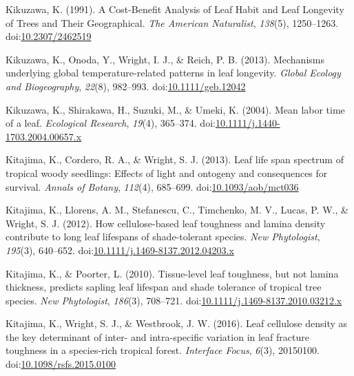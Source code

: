 \documentclass[12pt,]{article}
\theoremstyle{definition}
\theoremstyle{definition}
\theoremstyle{definition}
\theoremstyle{remark}
\providecommand{\DIFdelend}{} %
\DeclareRobustCommand{\DIFdelend}{\DIFOaddend \let\includegraphics\DIFOincludegraphics} %
\begin{document}
\begin{itemize}
\DIFdelend \hypertarget{ref-Kikuzawa1991}{}%
Kikuzawa, K. (1991). A Cost-Benefit Analysis of Leaf Habit and Leaf
Longevity of Trees and Their Geographical. \emph{The American
Naturalist}, \emph{138}(5), 1250--1263.
doi:\href{https://doi.org/10.2307/2462519}{10.2307/2462519}

\leavevmode\hypertarget{ref-Kikuzawa2013}{}%
Kikuzawa, K., Onoda, Y., Wright, I. J., \& Reich, P. B. (2013).
Mechanisms underlying global temperature-related patterns in leaf
longevity. \emph{Global Ecology and Biogeography}, \emph{22}(8),
982--993.
doi:\href{https://doi.org/10.1111/geb.12042}{10.1111/geb.12042}

\leavevmode\hypertarget{ref-Kikuzawa2004}{}%
Kikuzawa, K., Shirakawa, H., Suzuki, M., \& Umeki, K. (2004). Mean labor
time of a leaf. \emph{Ecological Research}, \emph{19}(4), 365--374.
doi:\href{https://doi.org/10.1111/j.1440-1703.2004.00657.x}{10.1111/j.1440-1703.2004.00657.x}

\leavevmode\hypertarget{ref-Kitajima2013}{}%
Kitajima, K., Cordero, R. A., \& Wright, S. J. (2013). Leaf life span
spectrum of tropical woody seedlings: Effects of light and ontogeny and
consequences for survival. \emph{Annals of Botany}, \emph{112}(4),
685--699.
doi:\href{https://doi.org/10.1093/aob/mct036}{10.1093/aob/mct036}

\leavevmode\hypertarget{ref-Kitajima2012}{}%
Kitajima, K., Llorens, A. M., Stefanescu, C., Timchenko, M. V., Lucas,
P. W., \& Wright, S. J. (2012). How cellulose-based leaf toughness and
lamina density contribute to long leaf lifespans of shade-tolerant
species. \emph{New Phytologist}, \emph{195}(3), 640--652.
doi:\href{https://doi.org/10.1111/j.1469-8137.2012.04203.x}{10.1111/j.1469-8137.2012.04203.x}

\leavevmode\hypertarget{ref-Kitajima2010}{}%
Kitajima, K., \& Poorter, L. (2010). Tissue-level leaf toughness, but
not lamina thickness, predicts sapling leaf lifespan and shade tolerance
of tropical tree species. \emph{New Phytologist}, \emph{186}(3),
708--721.
doi:\href{https://doi.org/10.1111/j.1469-8137.2010.03212.x}{10.1111/j.1469-8137.2010.03212.x}

\leavevmode\hypertarget{ref-Kitajima2016}{}%
Kitajima, K., Wright, S. J., \& Westbrook, J. W. (2016). Leaf cellulose
density as the key determinant of inter- and intra-specific variation in
leaf fracture toughness in a species-rich tropical forest.
\emph{Interface Focus}, \emph{6}(3), 20150100.
doi:\href{https://doi.org/10.1098/rsfs.2015.0100}{10.1098/rsfs.2015.0100}


\end{itemize}
\end{document}

